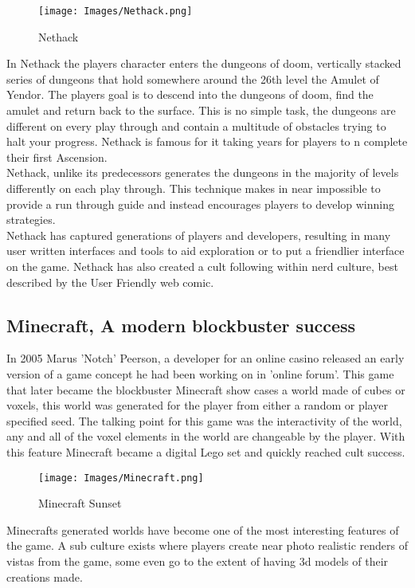\begin{figure}[h!]
  \texttt{[image: Images/Nethack.png]}
  \caption{Nethack}
\end{figure}

In Nethack the players character enters the dungeons of doom, vertically stacked
series of dungeons that hold somewhere around the 26th level the Amulet of 
Yendor. The players goal is to descend into the dungeons of doom, find the
amulet and return back to the surface. This is no simple task, the dungeons are 
different on every play through and contain a multitude of obstacles
trying to halt your progress. Nethack is famous for it taking years for players to 
n
complete their first Ascension.\\

Nethack, unlike its predecessors generates the dungeons in the majority of levels
differently on each play through. This technique makes in near impossible to 
provide a run through guide and instead encourages players to develop winning
strategies.\\

Nethack has captured generations of players and developers, resulting in many 
user written interfaces and tools to aid exploration or to put a friendlier 
interface on the game. Nethack has also created a cult following within nerd 
culture, best described by the User Friendly web comic.\\

\subsection*{Minecraft, A modern blockbuster success}
In 2005 Marus 'Notch' Peerson, a developer for an online casino released an
early version of a game concept he had been working on in 'online forum'. This
game that later became the blockbuster Minecraft show cases a world made of cubes 
or voxels, this world was generated for the player from either a random or 
player specified seed. The talking point for this game was the interactivity of
the world, any and all of the voxel elements in the world are changeable by the
player. With this feature Minecraft became a digital Lego set and quickly 
reached cult success.\\

\begin{figure}[h!]
  \texttt{[image: Images/Minecraft.png]}
  \caption{Minecraft Sunset}
\end{figure}

Minecrafts generated worlds have become one of the most interesting features of 
the game. A sub culture exists where players create near photo realistic renders
of vistas from the game, some even go to the extent of having 3d models of their
creations made. \\
